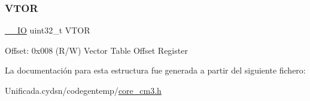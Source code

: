 \subsubsection{\texorpdfstring{V\+T\+OR}{VTOR}}
{\footnotesize\ttfamily \mbox{\hyperlink{core__cm3_8h_aec43007d9998a0a0e01faede4133d6be}{\+\_\+\+\_\+\+IO}} uint32\+\_\+t V\+T\+OR}

Offset\+: 0x008 (R/W) Vector Table Offset Register 

La documentación para esta estructura fue generada a partir del siguiente fichero\+:\begin{DoxyCompactItemize}
\item 
Unificada.\+cydsn/codegentemp/\mbox{\hyperlink{core__cm3_8h}{core\+\_\+cm3.\+h}}\end{DoxyCompactItemize}
